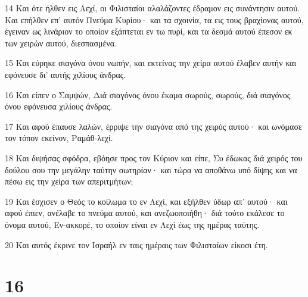 \par 14 Και ότε ήλθεν εις Λεχί, οι Φιλισταίοι αλαλάζοντες έδραμον εις συνάντησιν αυτού. Και επήλθεν επ' αυτόν Πνεύμα Κυρίου· και τα σχοινία, τα εις τους βραχίονας αυτού, έγειναν ως λινάριον το οποίον εξάπτεται εν τω πυρί, και τα δεσμά αυτού έπεσον εκ των χειρών αυτού, διεσπασμένα.
\par 15 Και εύρηκε σιαγόνα όνου νωπήν, και εκτείνας την χείρα αυτού έλαβεν αυτήν και εφόνευσε δι' αυτής χιλίους άνδρας.
\par 16 Και είπεν ο Σαμψών, Διά σιαγόνος όνου έκαμα σωρούς, σωρούς, διά σιαγόνος όνου εφόνευσα χιλίους άνδρας.
\par 17 Και αφού έπαυσε λαλών, έρριψε την σιαγόνα από της χειρός αυτού· και ωνόμασε τον τόπον εκείνον, Ραμάθ-λεχί.
\par 18 Και διψήσας σφόδρα, εβόησε προς τον Κύριον και είπε, Συ έδωκας διά χειρός του δούλου σου την μεγάλην ταύτην σωτηρίαν· και τώρα να αποθάνω υπό δίψης και να πέσω εις την χείρα των απεριτμήτων;
\par 19 Και έσχισεν ο Θεός το κοίλωμα το εν Λεχί, και εξήλθεν ύδωρ απ' αυτού· και αφού έπιεν, ανέλαβε το πνεύμα αυτού, και ανεζωοποιήθη· διά τούτο εκάλεσε το όνομα αυτού, Εν-ακκορέ, το οποίον είναι εν Λεχί έως της ημέρας ταύτης.
\par 20 Και αυτός έκρινε τον Ισραήλ εν ταις ημέραις των Φιλισταίων είκοσι έτη.

\chapter{16}

